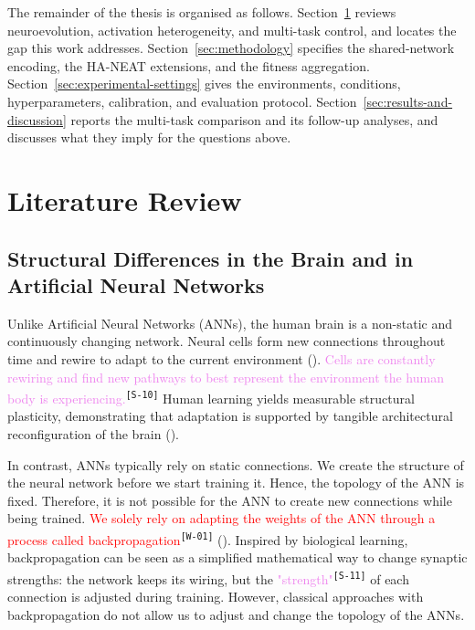 \documentclass[12pt]{article}
\newcommand{\revID}[1]{\textsuperscript{\scriptsize\texttt{[#1]}}}
\newcommand{\revWrong}[2]{\textcolor{red}{#2}\revID{#1}}      %
\newcommand{\revStyle}[2]{\textcolor{violet}{#2}\revID{#1}}   %
\begin{document}
The remainder of the thesis is organised as follows.
Section~\ref{sec:literature-review} reviews neuroevolution, activation heterogeneity, and multi-task control, and locates the gap this work addresses.
Section~\ref{sec:methodology} specifies the shared-network encoding, the HA-NEAT extensions, and the fitness aggregation.
Section~\ref{sec:experimental-settings} gives the environments, conditions, hyperparameters, calibration, and evaluation protocol.
Section~\ref{sec:results-and-discussion} reports the multi-task comparison and its follow-up analyses, and discusses what they imply for the questions above.

\newpage
\section{Literature Review}
\label{sec:literature-review}


\subsection{Structural Differences in the Brain and in Artificial Neural Networks}
\label{subsec:structural-differences-in-the-brain-and}


Unlike Artificial Neural Networks (ANNs), the human brain is a non-static and continuously changing network.
Neural cells form new connections throughout time and rewire to adapt to the current environment (\cite{pascualleone_plastic_2005,holtmaat_experience-dependent_2009}).
\revStyle{S-10}{Cells are constantly rewiring and find new pathways to best represent the environment the human body is experiencing.}
Human learning yields measurable structural plasticity, demonstrating that adaptation is supported by tangible architectural reconfiguration of the brain (\cite{draganski_changes_2004}).

In contrast, ANNs typically rely on static connections.
We create the structure of the neural network before we start training it.
Hence, the topology of the ANN is fixed.
Therefore, it is not possible for the ANN to create new connections while being trained.
\revWrong{W-01}{We solely rely on adapting the weights of the ANN through a process called backpropagation} (\cite{rumelhart_learning_1986}).
Inspired by biological learning, backpropagation can be seen as a simplified mathematical way to change synaptic strengths: the network keeps its wiring, but the \revStyle{S-11}{"strength"} of each connection is adjusted during training.
However, classical approaches with backpropagation do not allow us to adjust and change the topology of the ANNs.
\end{document}
